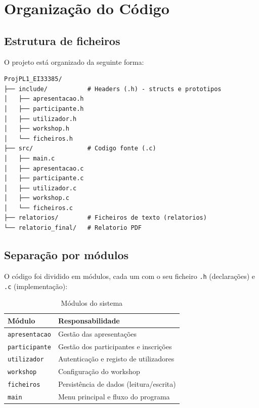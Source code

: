 \documentclass[12pt,a4paper]{article}
\begin{document}
\section{Organização do Código}

\subsection{Estrutura de ficheiros}

O projeto está organizado da seguinte forma:

\begin{verbatim}
ProjPL1_EI33385/
├── include/           # Headers (.h) - structs e prototipos
│   ├── apresentacao.h
│   ├── participante.h
│   ├── utilizador.h
│   ├── workshop.h
│   └── ficheiros.h
├── src/               # Codigo fonte (.c)
│   ├── main.c
│   ├── apresentacao.c
│   ├── participante.c
│   ├── utilizador.c
│   ├── workshop.c
│   └── ficheiros.c
├── relatorios/        # Ficheiros de texto (relatorios)
└── relatorio_final/   # Relatorio PDF
\end{verbatim}

\subsection{Separação por módulos}

O código foi dividido em módulos, cada um com o seu ficheiro \texttt{.h} (declarações) e \texttt{.c} (implementação):

\begin{table}[H]
\centering
\begin{tabular}{ll}
\toprule
\textbf{Módulo} & \textbf{Responsabilidade} \\
\midrule
\texttt{apresentacao} & Gestão das apresentações \\
\texttt{participante} & Gestão dos participantes e inscrições \\
\texttt{utilizador} & Autenticação e registo de utilizadores \\
\texttt{workshop} & Configuração do workshop \\
\texttt{ficheiros} & Persistência de dados (leitura/escrita) \\
\texttt{main} & Menu principal e fluxo do programa \\
\bottomrule
\end{tabular}
\caption{Módulos do sistema}
\end{table}
\end{document}
